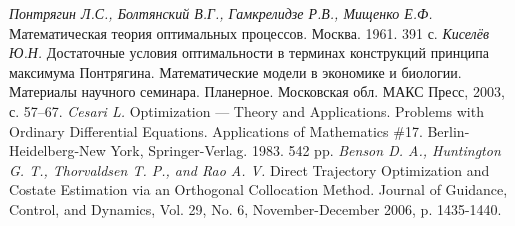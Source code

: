 \documentclass[12pt, a4paper]{article}
\begin{document}
\begin{thebibliography}{30}

{\it Понтрягин Л.С., Болтянский В.Г., Гамкрелидзе Р.В., Мищенко Е.Ф.} Математическая теория оптимальных процессов. Москва. 1961. 391 с.
{\it Киселёв Ю.Н.} Достаточные условия оптимальности в терминах конструкций принципа максимума Понтрягина.
Математические модели в экономике и биологии. Материалы научного семинара. Планерное. Московская обл.
МАКС Пресс, 2003, с. 57--67.
{\it Cesari L.} Optimization — Theory and Applications. Problems with Ordinary Differential Equations. Applications of Mathematics \#17. Berlin-Heidelberg-New York, Springer-Verlag. 1983. 542 pp.
{\it Benson D. A., Huntington G. T., Thorvaldsen T. P., and Rao A. V.} Direct Trajectory Optimization and Costate Estimation via an Orthogonal Collocation Method. Journal of Guidance, Control, and Dynamics, Vol. 29, No. 6, November-December 2006, p. 1435-1440.
\end{thebibliography}
\end{document}
